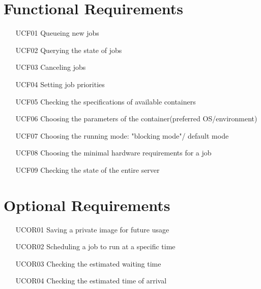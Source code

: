 \section{Functional Requirements}
\begin{itemize}
  \item [UCF01] Queueing new jobs
  \item [UCF02] Querying the state of jobs
  \item [UCF03] Canceling jobs
  \item [UCF04] Setting job priorities
  \item [UCF05] Checking the specifications of available containers
  \item [UCF06] Choosing the parameters of the container(preferred OS/environment)
  \item [UCF07] Choosing the running mode: "blocking mode"/ default mode
  \item [UCF08] Choosing the minimal hardware requirements for a job
  \item [UCF09] Checking the state of the entire server
\end{itemize}

\section{Optional Requirements}
\begin{itemize}
  \item [UCOR01] Saving a private image for future usage
  \item [UCOR02] Scheduling a job to run at a specific time
  \item [UCOR03] Checking the estimated waiting time
  \item [UCOR04] Checking the estimated time of arrival
\end{itemize}

